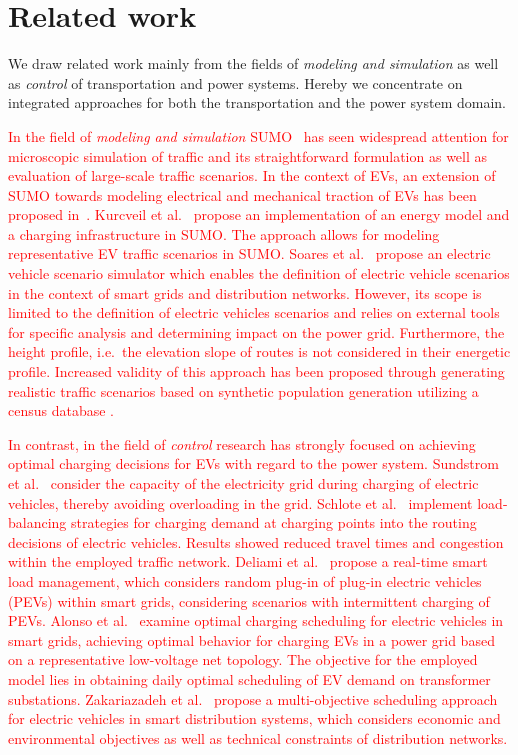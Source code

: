 \section{Related work}
\label{section:retrospection}

We draw related work mainly from the fields of \textit{modeling and simulation} as well as \textit{control} of transportation and power systems. Hereby we concentrate on integrated approaches for both the transportation and the power system domain.

\textcolor{red}{
In the field of \textit{modeling and simulation} SUMO~\cite{behrisch2011sumo} has seen widespread attention for microscopic simulation of traffic and its straightforward formulation as well as evaluation of large-scale traffic scenarios. In the context of EVs, an extension of SUMO towards modeling electrical and mechanical traction of EVs has been proposed in~\cite{maia2011electric}. Kurcveil et al.~\cite{kurczveil2014implementation} propose an implementation of an energy model and a charging infrastructure in SUMO. The approach allows for modeling representative EV traffic scenarios in SUMO. Soares et al.~\cite{soares2012electric} propose an electric vehicle scenario simulator which enables the definition of electric vehicle scenarios in the context of smart grids and distribution networks. However, its scope is limited to the definition of electric vehicles scenarios and relies on external tools for specific analysis and determining impact on the power grid. Furthermore, the height profile, i.e.\ the elevation slope of routes is not considered in their energetic profile. Increased validity of this approach has been proposed through generating realistic traffic scenarios based on synthetic population generation utilizing a census database \cite{soares2014realistic}.
}

\textcolor{red}{
In contrast, in the field of \textit{control} research has strongly focused on achieving optimal charging decisions for EVs with regard to the power system. Sundstrom et al.~\cite{sundstrom2010planning} consider the capacity of the electricity grid during charging of electric vehicles, thereby avoiding overloading in the grid. Schlote et al.~\cite{schlote2012balanced} implement load-balancing strategies for charging demand at charging points into the routing decisions of electric vehicles. Results showed reduced travel times and congestion within the employed traffic network. Deliami et al.~\cite{deilami2011real} propose a real-time smart load management, which considers random plug-in of plug-in electric vehicles (PEVs) within smart grids, considering scenarios with intermittent charging of PEVs. Alonso et al.~\cite{alonso2014optimal} examine optimal charging scheduling for electric vehicles in smart grids, achieving optimal behavior for charging EVs in a power grid based on a representative low-voltage net topology. The objective for the employed model lies in obtaining daily optimal scheduling of EV demand on transformer substations. Zakariazadeh et al.~\cite{zakariazadeh2014multi} propose a multi-objective scheduling approach for electric vehicles in smart distribution systems, which considers economic and environmental objectives as well as technical constraints of distribution networks.
}

